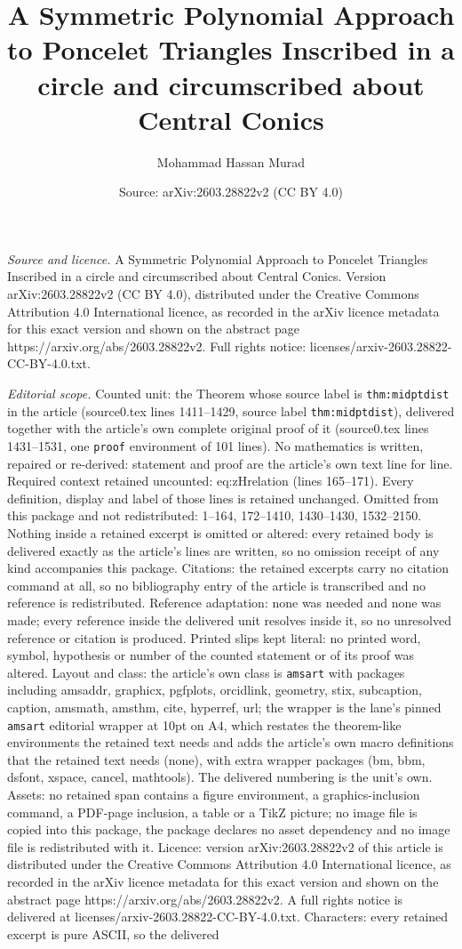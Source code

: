 \documentclass[10pt,a4paper]{amsart}
\title[A Symmetric Polynomial Approach to Poncelet Triangles Inscri]{A Symmetric Polynomial Approach to Poncelet Triangles Inscribed in a circle and circumscribed about Central Conics}
\author{Mohammad Hassan Murad}
\date{Source: arXiv:2603.28822v2 (CC BY 4.0)}
\begin{document}
\maketitle

\noindent\emph{Source and licence.} A Symmetric Polynomial Approach to Poncelet Triangles Inscribed in a circle and circumscribed about Central Conics. Version arXiv:2603.28822v2 (CC BY 4.0), distributed under the Creative Commons Attribution 4.0 International licence, as recorded in the arXiv licence metadata for this exact version and shown on the abstract page https://arxiv.org/abs/2603.28822v2. Full rights notice: licenses/arxiv-2603.28822-CC-BY-4.0.txt.\par\smallskip

\noindent\textit{Editorial scope.} Counted unit: the Theorem whose source label is \texttt{thm:midptdist} in the article (source0.tex lines 1411--1429, source label \texttt{thm:midptdist}), delivered together with the article's own complete original proof of it (source0.tex lines 1431--1531, one \texttt{proof} environment of 101 lines). No mathematics is written, repaired or re-derived: statement and proof are the article's own text line for line. Required context retained uncounted: eq:zHrelation (lines 165--171). Every definition, display and label of those lines is retained unchanged. Omitted from this package and not redistributed: 1--164, 172--1410, 1430--1430, 1532--2150. Nothing inside a retained excerpt is omitted or altered: every retained body is delivered exactly as the article's lines are written, so no omission receipt of any kind accompanies this package. Citations: the retained excerpts carry no citation command at all, so no bibliography entry of the article is transcribed and no reference is redistributed. Reference adaptation: none was needed and none was made; every reference inside the delivered unit resolves inside it, so no unresolved reference or citation is produced. Printed slips kept literal: no printed word, symbol, hypothesis or number of the counted statement or of its proof was altered. Layout and class: the article's own class is \texttt{amsart} with packages including amsaddr, graphicx, pgfplots, orcidlink, geometry, stix, subcaption, caption, amsmath, amsthm, cite, hyperref, url; the wrapper is the lane's pinned \texttt{amsart} editorial wrapper at 10pt on A4, which restates the theorem-like environments the retained text needs and adds the article's own macro definitions that the retained text needs (none), with extra wrapper packages (bm, bbm, dsfont, xspace, cancel, mathtools). The delivered numbering is the unit's own. Assets: no retained span contains a figure environment, a graphics-inclusion command, a PDF-page inclusion, a table or a TikZ picture; no image file is copied into this package, the package declares no asset dependency and no image file is redistributed with it. Licence: version arXiv:2603.28822v2 of this article is distributed under the Creative Commons Attribution 4.0 International licence, as recorded in the arXiv licence metadata for this exact version and shown on the abstract page https://arxiv.org/abs/2603.28822v2. A full rights notice is delivered at licenses/arxiv-2603.28822-CC-BY-4.0.txt. Characters: every retained excerpt is pure ASCII, so the delivered 
\end{document}
